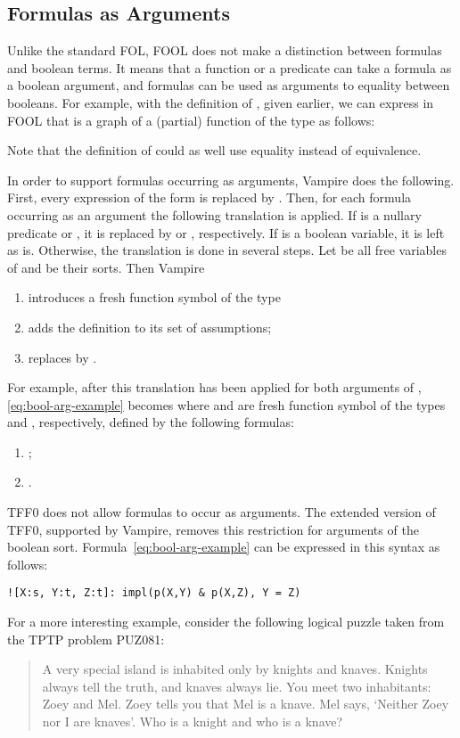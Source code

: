 \subsection{Formulas as Arguments}

Unlike the standard FOL, FOOL does not make a distinction between formulas and boolean terms. It means that a function or a predicate can take a formula as a boolean argument, and formulas can be used as arguments to equality between booleans. For example, with the definition of , given earlier, we can express in FOOL that
 is a graph of a (partial) function of the type  as follows:


Note that the definition of  could as well use equality instead of equivalence.

In order to support formulas occurring as arguments, Vampire does the following. First, every expression of the form  is replaced by . Then, for each formula  occurring as an argument the following translation is applied. If  is a nullary predicate  or , it is replaced by  or , respectively. If  is a boolean variable, it is left as is. Otherwise, the translation is done in several steps. Let  be all free variables of  and  be their sorts. Then Vampire
\begin{enumerate}
  \item introduces a fresh function symbol  of the type 
  \item adds the definition  to its set of assumptions;
  \item replaces  by .
\end{enumerate}

For example, after this translation has been applied for both arguments of , \eqref{eq:bool-arg-example} becomes  where  and  are fresh function symbol of the types  and , respectively, defined by the following formulas:
\begin{enumerate}
  \item ;
  \item .
\end{enumerate}

TFF0 does not allow formulas to occur as arguments. The extended version of TFF0, supported by Vampire, removes this restriction for arguments of the boolean sort. Formula~\eqref{eq:bool-arg-example} can be expressed in this syntax as follows:
\begin{lstlisting}
![X:s, Y:t, Z:t]: impl(p(X,Y) & p(X,Z), Y = Z)
\end{lstlisting}

For a more interesting example, consider the following logical puzzle taken from the TPTP problem \mbox{PUZ081}:
\begin{quote}
  A very special island is inhabited only by knights and knaves. Knights always tell the truth, and knaves always lie. You meet two inhabitants: Zoey and Mel. Zoey tells you that Mel is a knave. Mel says, `Neither Zoey nor I are knaves'. Who is a knight and who is a knave?
\end{quote}

